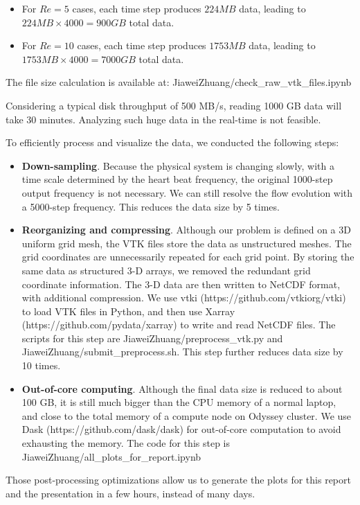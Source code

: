 \begin{itemize}
	\item For $Re = 5$ cases, each time step produces $224 MB$ data, leading to $224 MB \times 4000 = 900 GB$ total data.
	\item For $Re = 10$ cases, each time step produces $1753 MB$ data, leading to $1753 MB \times 4000 = 7000 GB$ total data.
\end{itemize}

The file size calculation is available at: JiaweiZhuang/check\_raw\_vtk\_files.ipynb

Considering a typical disk throughput of 500 MB/s, reading 1000 GB data will take 30 minutes. Analyzing such huge data in the real-time is not feasible. 

To efficiently process and visualize the data, we conducted the following steps:

\begin{itemize}
	\item \textbf{Down-sampling}. Because the physical system is changing slowly, with a time scale determined by the heart beat frequency, the original 1000-step output frequency is not necessary. We can still resolve the flow evolution with a 5000-step frequency. This reduces the data size by 5 times.
	\item \textbf{Reorganizing and compressing}. Although our problem is defined on a 3D uniform grid mesh, the VTK files store the data as unstructured meshes. The grid coordinates are unnecessarily repeated for each grid point. By storing the same data as structured 3-D arrays, we removed the redundant grid coordinate information. The 3-D data are then written to NetCDF format, with additional compression. We use vtki (https://github.com/vtkiorg/vtki) to load VTK files in Python, and then use Xarray (https://github.com/pydata/xarray) to write and read NetCDF files. The scripts for this step are JiaweiZhuang/preprocess\_vtk.py and JiaweiZhuang/submit\_preprocess.sh. This step further reduces data size by 10 times. 
	\item \textbf{Out-of-core computing}. Although the final data size is reduced to about 100 GB, it is still much bigger than the CPU memory of a normal laptop, and close to the total memory of a compute node on Odyssey cluster. We use Dask (https://github.com/dask/dask) for out-of-core computation to avoid exhausting the memory. The code for this step is JiaweiZhuang/all\_plots\_for\_report.ipynb
\end{itemize}

Those post-processing optimizations allow us to generate the plots for this report and the presentation in a few hours, instead of many days.
